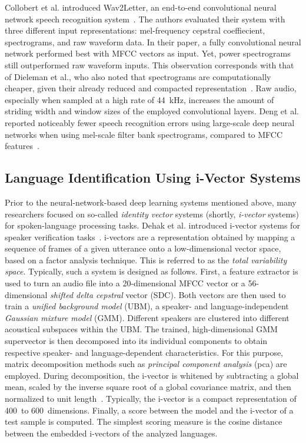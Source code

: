 Collobert et al. introduced Wav2Letter, an end-to-end convolutional neural network speech recognition system~\cite{collobert2016wav2letter}. The authors evaluated their system with three different input representations: mel-frequency cepstral coeffiecient, spectrograms, and raw waveform data. In their paper, a fully convolutional neural network performed best with MFCC vectors as input. Yet, power spectrograms still outperformed raw waveform inputs. This observation corresponds with that of Dieleman et al., who also noted that spectrograms are computationally cheaper, given their already reduced and compacted representation~\cite{dieleman2014end}. Raw audio, especially when sampled at a high rate of \SI{44}{\kilo\hertz}, increases the amount of striding width and window sizes of the employed convolutional layers.
Deng et al. reported noticeably fewer speech recognition errors using large-scale deep neural networks when using mel-scale filter bank spectrograms, compared to MFCC features~\cite{deng2013recent}.

\subsection{Language Identification Using i-Vector Systems}
\label{sec:i-vector-systems}
Prior to the neural-network-based deep learning systems mentioned above, many researchers focused on so-called \emph{identity vector} systems (shortly, \emph{i-vector} systems) for spoken-language processing tasks. Dehak et al. introduced i-vector systems for speaker verification tasks~\cite{dehak2011front}. i-vectors are a representation obtained by mapping a sequence of frames of a given utterance onto a low-dimensional vector space, based on a factor analysis technique. This is referred to as the \emph{total variability space}. Typically, such a system is designed as follows. First, a feature extractor is used to turn an audio file into a \num{20}-dimensional MFCC vector or a \num{56}-dimensional \emph{shifted delta cepstral} vector (SDC). Both vectors are then used to train a \emph{unified background model} (UBM), a speaker- and language-independent \emph{Gaussian mixture model} (GMM). Different speakers are clustered into different acoustical subspaces within the UBM. The trained, high-dimensional GMM supervector is then decomposed into its individual components to obtain respective speaker- and language-dependent characteristics. For this purpose, matrix decomposition methods such as \emph{principal component analysis} (\ac{pca}) are employed. During decomposition, the i-vector is whitened by subtracting a global mean, scaled by the inverse square root of a global covariance matrix, and then normalized to unit length~\cite{garcia2011analysis}. Typically, the i-vector is a compact representation of \num{400}~to \num{600}~dimensions. Finally, a score between the model and the i-vector of a test sample is computed. The simplest scoring measure is the cosine distance between the embedded i-vectors of the analyzed languages.

